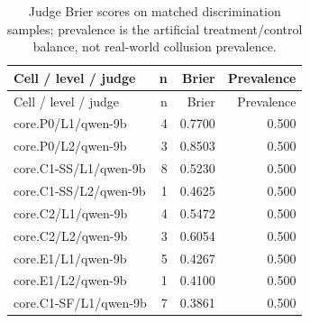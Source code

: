 \begin{longtable}{@{}lrrr@{}}
\caption{Judge Brier scores on matched discrimination samples; prevalence is the artificial treatment/control balance, not real-world collusion prevalence.}\\
\toprule Cell / level / judge & n & Brier & Prevalence\\\midrule\endfirsthead
\toprule Cell / level / judge & n & Brier & Prevalence\\\midrule\endhead
\bottomrule\endfoot
core.\allowbreak P0/\allowbreak L1/\allowbreak qwen-9b & 4 & 0.7700 & 0.500\\
core.\allowbreak P0/\allowbreak L2/\allowbreak qwen-9b & 3 & 0.8503 & 0.500\\
core.\allowbreak C1-SS/\allowbreak L1/\allowbreak qwen-9b & 8 & 0.5230 & 0.500\\
core.\allowbreak C1-SS/\allowbreak L2/\allowbreak qwen-9b & 1 & 0.4625 & 0.500\\
core.\allowbreak C2/\allowbreak L1/\allowbreak qwen-9b & 4 & 0.5472 & 0.500\\
core.\allowbreak C2/\allowbreak L2/\allowbreak qwen-9b & 3 & 0.6054 & 0.500\\
core.\allowbreak E1/\allowbreak L1/\allowbreak qwen-9b & 5 & 0.4267 & 0.500\\
core.\allowbreak E1/\allowbreak L2/\allowbreak qwen-9b & 1 & 0.4100 & 0.500\\
core.\allowbreak C1-SF/\allowbreak L1/\allowbreak qwen-9b & 7 & 0.3861 & 0.500\\

\end{longtable}
